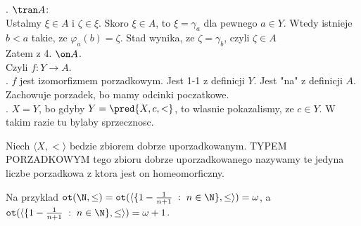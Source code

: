 \documentclass{article}
\begin{document}
    . $\tran A$:\smallskip\\
    Ustalmy $\xi\in A$ i $\zeta\in \xi$. Skoro $\xi\in A$, to $\xi=\gamma_a$ dla pewnego $a\in Y$. Wtedy istnieje $b<a$ takie, ze $\varphi_a(b)=\zeta$. Stad wynika, ze $\zeta=\gamma_b$, czyli $\zeta\in A$\smallskip\\
    Zatem z 4. $\on A$.\smallskip\\
    Czyli $f:Y\to A$.\smallskip\\
    . $f$ jest izomorfizmem porzadkowym. Jest 1-1 z definicji $Y$. Jest "na" z definicji $A$. Zachowuje porzadek, bo mamy odcinki poczatkowe.\smallskip\\
    . $X=Y$, bo gdyby $Y=\pred{X,c,<}$, to wlasnie pokazalismy, ze $c\in Y$. W takim razie tu bylaby sprzecznosc.
    \kondow
    \begin{center}\large
        Niech $\langle X, <\rangle$ bedzie zbiorem dobrze uporzadkowanym. {\color{def}TYPEM PORZADKOWYM} tego zbioru dobrze uporzadkowanego nazywamy te jedyna liczbe porzadkowa z ktora jest on homeomorficzny.
    \end{center}
    Na przyklad $\texttt{ot}(\N, \leq)=\texttt{ot}(\langle \{1-\frac1{n+1}\;:\;n\in\N\},\leq\rangle)=\omega$, a $\texttt{ot}(\langle \{1-\frac1{n+1}\;:\;n\in\N\},\leq\rangle)=\omega+1$.
\end{document}
